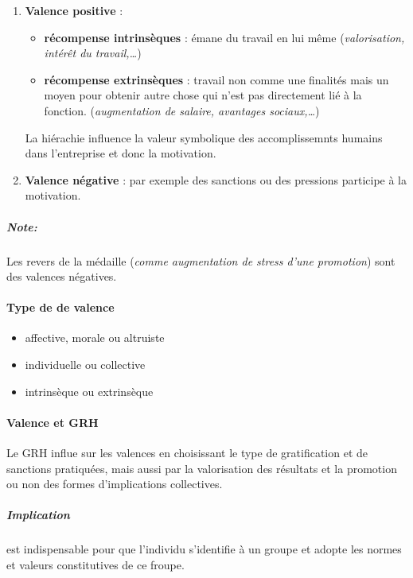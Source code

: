 \documentclass[11pt]{article} %
\begin{document}
\begin{enumerate}
    \item \textbf{Valence positive} :
        \begin{itemize}
           \item \textbf{récompense intrinsèques} : émane du travail en
               lui même (\textit{valorisation, intérêt du
               travail,\ldots})
           \item \textbf{récompense extrinsèques} : travail non comme
               une finalités mais un moyen pour obtenir autre chose qui
               n'est pas directement lié à la fonction.
               (\textit{augmentation de salaire, avantages
               sociaux,\ldots})
        \end{itemize}

        La hiérachie influence la valeur symbolique des accomplissemnts
        humains dans l'entreprise et donc la motivation.

    \item \textbf{Valence négative} : par exemple des sanctions ou des
        pressions participe à la motivation.
\end{enumerate}

\subparagraph{Note: } Les revers de la médaille (\textit{comme
augmentation de stress d'une promotion}) sont des valences négatives.

\paragraph{Type de de valence}

\begin{itemize}
    \item affective, morale ou altruiste
    \item individuelle ou collective
    \item intrinsèque ou extrinsèque
\end{itemize}

\paragraph{Valence et GRH}

Le GRH influe sur les valences en choisissant le type de gratification
et de sanctions pratiquées, mais aussi par la valorisation des
résultats et la promotion ou non des formes d'implications collectives.

\subparagraph{Implication} est indispensable pour que l'individu
s'identifie à un groupe et adopte les normes et valeurs constitutives de
ce froupe.
\end{document}
